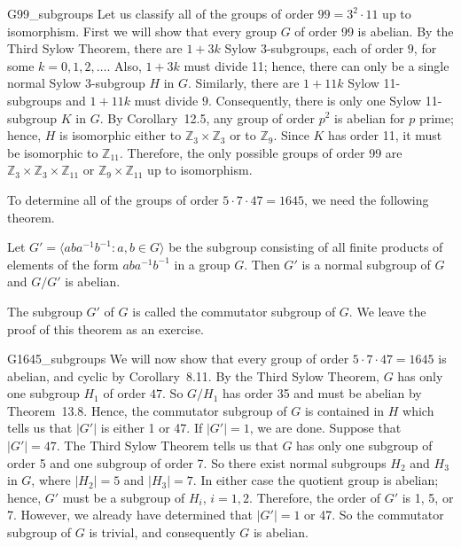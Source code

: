  
\begin{example}{G99_subgroups}
Let us classify all of the groups of order $99 = 3^2 \cdot 11$ up to
isomorphism. First we will show that every group $G$ of order 99 is
abelian.  By the Third Sylow Theorem, there are $1 + 3k$ Sylow
3-subgroups, each of order $9$, for some $k = 0, 1, 2, \ldots$.  Also,
$1 + 3k$ must divide 11; hence, there can only be a single normal
Sylow 3-subgroup $H$ in $G$.  Similarly, there are $1 +11k$ Sylow
11-subgroups and $1 +11k$ must divide $9$.  Consequently, there is
only one Sylow 11-subgroup $K$ in $G$.  By Corollary~12.5, any group
of order $p^2$ is abelian for $p$ prime; hence, $H$ is isomorphic either 
to ${\mathbb Z}_3 \times {\mathbb Z}_3$ or to ${\mathbb Z}_9$.  Since $K$ has 
order 11, it must be isomorphic to ${\mathbb Z}_{11}$.  Therefore, the only
possible groups of order 99 are ${\mathbb Z}_3 \times {\mathbb Z}_3 \times
{\mathbb Z}_{11}$ or ${\mathbb Z}_9 \times {\mathbb Z}_{11}$ up to isomorphism.
\end{example}
 
 
\medskip
 
 
To determine all of the groups of order $5 \cdot 7 \cdot 47 = 1645$,
we need the following theorem. 
 
 
\begin{theorem}
Let $G' = \langle a b a^{-1} b^{-1} : a, b \in G \rangle$ be the
subgroup  consisting of all finite products of elements of the form
$aba^{-1}b^{-1}$ in a group $G$. Then $G'$ is a normal subgroup of $G$
and $G/G'$ is abelian. 
\end{theorem}
 
 
The subgroup $G'$ of $G$ is called the {\bfi commutator
subgroup\/} of $G$. We leave the proof of
this theorem as an exercise. 
 
 
\begin{example}{G1645_subgroups}
We will now show that every group of order $5 \cdot 7 \cdot 47 =
1645$ is abelian, and cyclic by Corollary~8.11. By the Third Sylow
Theorem, $G$ has only one subgroup $H_1$ of order $47$.  So $G/H_1$
has order 35 and must be abelian by Theorem~13.8. Hence, the
commutator subgroup of $G$ is contained in $H$ which tells us that
$|G'|$ is either 1 or 47. If $|G'|=1$, we are done. Suppose that
$|G'|=47$. The Third Sylow Theorem tells us that $G$ has only one
subgroup of order 5 and one subgroup of order 7.  So there exist
normal subgroups $H_2$  and $H_3$ in $G$, where $|H_2| = 5$ and $|H_3|
= 7$. In either case the quotient group is abelian; hence, $G'$ must
be a subgroup of $H_i$, $i= 1, 2$. Therefore, the order of $G'$ is 1,
5, or 7. However, we already have determined that $|G'| =1$ or 47. So
the commutator subgroup of $G$ is trivial, and consequently $G$ is
abelian.
\end{example}
 
